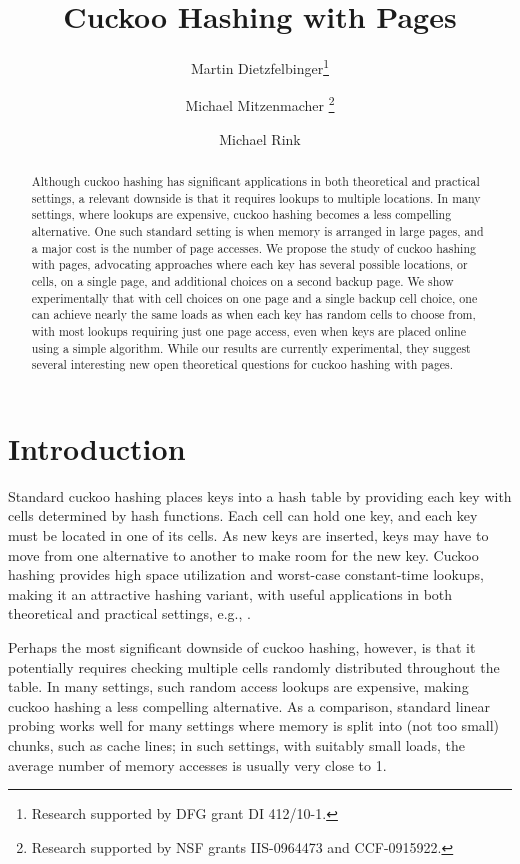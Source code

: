 \let\accentvec\vec \documentclass{llncs}
\author{Martin Dietzfelbinger\inst{1}\thanks{Research supported by DFG grant DI 412/10-1.}
\and Michael Mitzenmacher \inst{2}\thanks{Research supported by NSF grants IIS-0964473 and CCF-0915922.}
\and Michael Rink\inst{1}
}
\institute{Fakult\"at f\"ur Informatik und Automatisierung, Technische Universit\"at Ilmenau
\email{\{martin.dietzfelbinger,michael.rink\}@tu-ilmenau.de}
\and School of Engineering and Applied Sciences, Harvard University
\email{michaelm@eecs.harvard.edu}
}
\title{Cuckoo Hashing with Pages}
\newcommand{\eg}{e.g.}
\begin{document}
\maketitle
\begin{abstract}  
Although cuckoo hashing has significant applications in both
theoretical and practical settings, a relevant downside is that it
requires lookups to multiple locations.  In many settings, where
lookups are expensive, cuckoo hashing becomes a less compelling
alternative.  One such standard setting is when memory is arranged in
large pages, and a major cost is the number of page accesses.  We
propose the study of cuckoo hashing with pages, advocating approaches
where each key has several possible locations, or cells, on a single
page, and additional choices on a second backup page.  We show
experimentally that with  cell choices on one page and a single
backup cell choice, one can achieve nearly the same loads as when each
key has  random cells to choose from, with most lookups requiring
just one page access, even when keys are placed online using 
a simple algorithm.  While our results are currently
experimental, they suggest several interesting new open theoretical
questions for cuckoo hashing with pages.
\end{abstract}  
\section{Introduction}
Standard cuckoo hashing places keys into a hash table by providing
each key with  cells determined by hash functions.  Each cell can
hold one key, and each key must be located in one of its cells.  As
new keys are inserted, keys may have to move from one alternative to
another to make room for the new key. Cuckoo hashing provides high
space utilization and worst-case constant-time lookups, making it an
attractive hashing variant, with useful applications in both
theoretical and practical settings, \eg, \cite{alcantara2009real,erlingsson2006cool,FotakisPSS2005,PaghR2004,ross2007efficient}.  

Perhaps the most significant downside of cuckoo hashing, however, is
that it potentially requires checking multiple cells randomly
distributed throughout the table.  In many settings, such random
access lookups are expensive, making cuckoo hashing a less compelling
alternative.  As a comparison, standard linear probing works
well for many settings where memory is split into (not too small)
chunks, such as cache lines; in such settings, with suitably small
loads, the average number of memory accesses is usually very close to
1.
\end{document}
